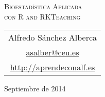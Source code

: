 \begin{titlepage}
\clearpage
\thispagestyle{empty}
\end{titlepage}

\null\newpage
\thispagestyle{empty}

\null\newpage
\thispagestyle{empty}
\vspace*{7cm}
\par

\begin{center}
\normalfont\fontsize{30}{30}\selectfont
\textsc{\color{blueceu}Bioestadística Aplicada\\ con R and RKTeaching}
\end{center}
\par  
\vspace*{3cm}
\begin{center}
\Large
\begin{tabular}{c}
Alfredo Sánchez Alberca\\
\url{asalber@ceu.es}\\
\url{http://aprendeconalf.es}
\end{tabular}
\end{center}

\vspace*{1cm}
\begin{center}
Septiembre de 2014
\end{center}
\par
\vfill

\newpage